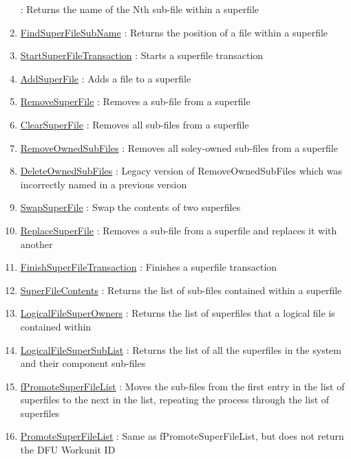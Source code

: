 \begin{enumerate}
: Returns the name of the Nth sub-file within a superfile
\item \hyperlink{ecldoc:file.findsuperfilesubname}{FindSuperFileSubName}
: Returns the position of a file within a superfile
\item \hyperlink{ecldoc:file.startsuperfiletransaction}{StartSuperFileTransaction}
: Starts a superfile transaction
\item \hyperlink{ecldoc:file.addsuperfile}{AddSuperFile}
: Adds a file to a superfile
\item \hyperlink{ecldoc:file.removesuperfile}{RemoveSuperFile}
: Removes a sub-file from a superfile
\item \hyperlink{ecldoc:file.clearsuperfile}{ClearSuperFile}
: Removes all sub-files from a superfile
\item \hyperlink{ecldoc:file.removeownedsubfiles}{RemoveOwnedSubFiles}
: Removes all soley-owned sub-files from a superfile
\item \hyperlink{ecldoc:file.deleteownedsubfiles}{DeleteOwnedSubFiles}
: Legacy version of RemoveOwnedSubFiles which was incorrectly named in a previous version
\item \hyperlink{ecldoc:file.swapsuperfile}{SwapSuperFile}
: Swap the contents of two superfiles
\item \hyperlink{ecldoc:file.replacesuperfile}{ReplaceSuperFile}
: Removes a sub-file from a superfile and replaces it with another
\item \hyperlink{ecldoc:file.finishsuperfiletransaction}{FinishSuperFileTransaction}
: Finishes a superfile transaction
\item \hyperlink{ecldoc:file.superfilecontents}{SuperFileContents}
: Returns the list of sub-files contained within a superfile
\item \hyperlink{ecldoc:file.logicalfilesuperowners}{LogicalFileSuperOwners}
: Returns the list of superfiles that a logical file is contained within
\item \hyperlink{ecldoc:file.logicalfilesupersublist}{LogicalFileSuperSubList}
: Returns the list of all the superfiles in the system and their component sub-files
\item \hyperlink{ecldoc:file.fpromotesuperfilelist}{fPromoteSuperFileList}
: Moves the sub-files from the first entry in the list of superfiles to the next in the list, repeating the process through the list of superfiles
\item \hyperlink{ecldoc:file.promotesuperfilelist}{PromoteSuperFileList}
: Same as fPromoteSuperFileList, but does not return the DFU Workunit ID
\end{enumerate}

